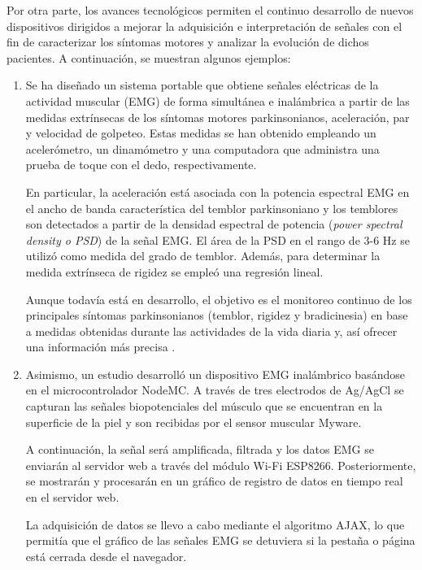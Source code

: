 Por otra parte, los avances tecnológicos permiten el continuo desarrollo de nuevos dispositivos dirigidos a mejorar la adquisición e interpretación de señales con el fin de caracterizar los síntomas motores y analizar la evolución de dichos pacientes. A continuación, se muestran algunos ejemplos:

\begin{enumerate}
    \item Se ha diseñado un sistema portable que obtiene señales eléctricas de la actividad muscular (EMG) de forma simultánea e inalámbrica a partir de las medidas extrínsecas de los síntomas motores parkinsonianos, aceleración, par y velocidad de golpeteo.  Estas medidas se han obtenido empleando un acelerómetro, un dinamómetro y una computadora que administra una prueba de toque con el dedo, respectivamente. 

    En particular, la aceleración está asociada con la potencia espectral EMG en el ancho de banda característica del temblor parkinsoniano y los temblores son detectados a partir de la densidad espectral de potencia (\textit{power spectral density o PSD}) de la señal EMG. El área de la PSD en el rango de 3-6 Hz se utilizó como medida del grado de temblor. Además, para determinar la medida extrínseca de rigidez se empleó una regresión lineal.
    
    Aunque todavía está en desarrollo, el objetivo es el monitoreo continuo de los principales síntomas parkinsonianos (temblor, rigidez y bradicinesia) en base a medidas obtenidas durante las actividades de la vida diaria y, así ofrecer una información más precisa \cite{askari2010emg}.
    
    \item Asimismo, un estudio desarrolló un dispositivo EMG inalámbrico basándose en el microcontrolador NodeMC. A través de tres electrodos de Ag/AgCl se capturan las señales biopotenciales del músculo que se encuentran en la superficie de la piel y son recibidas por el sensor muscular Myware.
    
    A continuación, la señal será amplificada, filtrada y los datos EMG se enviarán al servidor web a través del módulo Wi-Fi ESP8266. Posteriormente, se mostrarán y procesarán en un gráfico de registro de datos en tiempo real en el servidor web. 
    
    La adquisición de datos se llevo a cabo mediante el algoritmo AJAX, lo que permitía que el gráfico de las señales EMG se detuviera si la pestaña o página está cerrada desde el navegador.
    

\end{enumerate}
